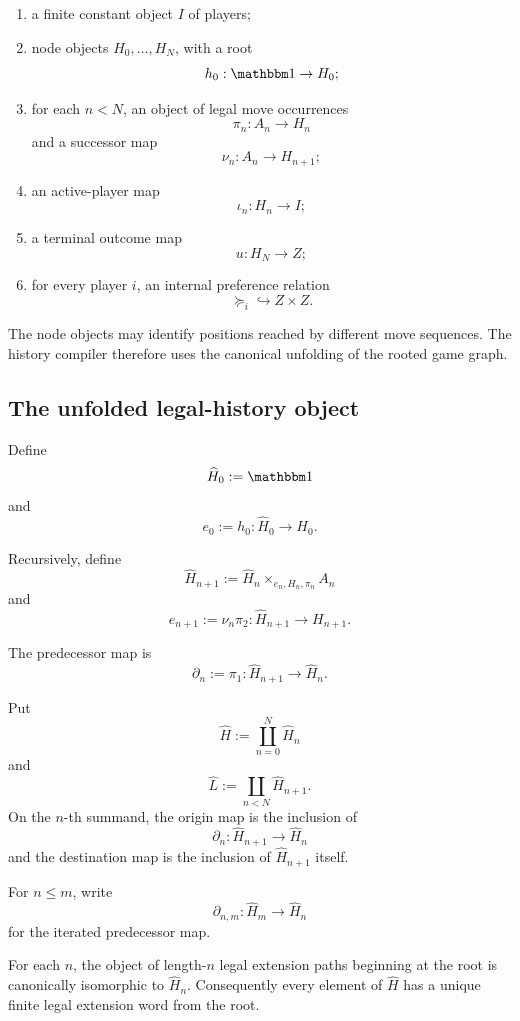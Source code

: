\begin{enumerate}
  \item a finite constant object \(I\) of players;
  \item node objects \(H_0,\ldots,H_N\), with a root
  \[
    h_0:\mathbbm1\to H_0;
  \]
  \item for each \(n<N\), an object of legal move occurrences
  \[
    \pi_n:A_n\to H_n
  \]
  and a successor map
  \[
    \nu_n:A_n\to H_{n+1};
  \]
  \item an active-player map
  \[
    \iota_n:H_n\to I;
  \]
  \item a terminal outcome map
  \[
    u:H_N\to Z;
  \]
  \item for every player \(i\), an internal preference relation
  \[
    \succeq_i\hookrightarrow Z\times Z.
  \]
\end{enumerate}

The node objects may identify positions reached by different move sequences. The history compiler
therefore uses the canonical unfolding of the rooted game graph.

\subsection{The unfolded legal-history object}

Define
\[
  \widehat H_0:=\mathbbm1
\]
and
\[
  e_0:=h_0:\widehat H_0\to H_0.
\]

Recursively, define
\[
  \widehat H_{n+1}
  :=
  \widehat H_n
  \times_{e_n,H_n,\pi_n}
  A_n
\]
and
\[
  e_{n+1}
  :=
  \nu_n\pi_2:
  \widehat H_{n+1}\to H_{n+1}.
\]

The predecessor map is
\[
  \partial_n:=\pi_1:
  \widehat H_{n+1}\to\widehat H_n.
\]

Put
\[
  \widehat H
  :=
  \coprod_{n=0}^{N}\widehat H_n
\]
and
\[
  \widehat L
  :=
  \coprod_{n<N}\widehat H_{n+1}.
\]
On the \(n\)-th summand, the origin map is the inclusion of
\[
  \partial_n:\widehat H_{n+1}\to\widehat H_n
\]
and the destination map is the inclusion of \(\widehat H_{n+1}\) itself.

For \(n\leq m\), write
\[
  \partial_{n,m}:
  \widehat H_m\to\widehat H_n
\]
for the iterated predecessor map.

\begin{proposition}
\label{prop:unique-unfolded-history-words}
For each \(n\), the object of length-\(n\) legal extension paths beginning at the root is canonically
isomorphic to \(\widehat H_n\). Consequently every element of \(\widehat H\) has a unique finite
legal extension word from the root.
\end{proposition}

